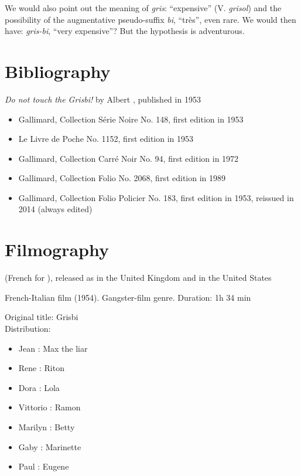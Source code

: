 
We would also point out the meaning of \emph{gris}: ``expensive'' (V. \emph{grisol}) and the possibility of the augmentative pseudo-suffix \emph{bi}, ``très'', even rare. We would then have: \emph{gris-bi}, ``very expensive''? But the hypothesis is adventurous.


\section{Bibliography\label{preamble-biblio}}

\emph{Do not touch the Grisbi!} by Albert , published in 1953

\begin{itemize}\itemsep=0pt
	\item Gallimard, Collection Série Noire No. 148, first edition in 1953
	\item Le Livre de Poche No. 1152, first edition in 1953
	\item Gallimard, Collection Carré Noir No. 94, first edition in 1972
	\item Gallimard, Collection Folio No. 2068, first edition in 1989
	\item Gallimard, Collection Folio Policier No. 183, first edition in 1953, reissued in 2014 (always edited)
\end{itemize}

\section{Filmography\label{preamble-filmography}}

 (French for ), released as  in the United Kingdom and  in the United States

French-Italian film (1954). Gangster-film genre. Duration: 1h 34 min

Original title: Grisbi\\

Distribution:

\begin{itemize}\itemsep=0pt
    \item Jean : Max the liar
    \item Rene : Riton
    \item Dora : Lola
    \item Vittorio : Ramon
    \item Marilyn : Betty
    \item Gaby : Marinette
    \item Paul : Eugene
\end{itemize}

